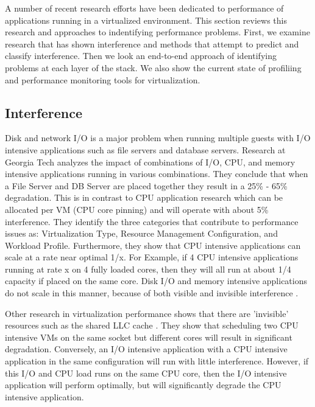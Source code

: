 A number of recent research efforts have been dedicated to performance of applications running in a virtualized environment.  This section reviews this research and approaches to indentifying performance problems.  First, we examine research that has shown interference and methods that attempt to predict and classify interference.   Then we look an end-to-end approach of identifying problems at each layer of the stack.  We also show the current state of profiliing and performance monitoring tools for virtualization.

\subsection{Interference}
Disk and network I/O is a major problem when running multiple guests with I/O intensive applications such as file servers and database servers.  Research at Georgia Tech \cite{paul} analyzes the impact of combinations of I/O, CPU, and memory intensive applications running in various combinations.  They conclude that when a File Server and DB Server are placed together they result in a 25\% - 65\% degradation.  This is in contrast to CPU application research \cite{huber1, huber2} which can be allocated per VM (CPU core pinning) and will operate with about 5\% interference.  They identify the three categories that contribute to performance issues as:  Virtualization Type, Resource Management Configuration, and Workload Profile.  Furthermore, they show that CPU intensive applications can scale at a rate near optimal 1/x.   For Example, if 4 CPU intensive applications running at rate x on 4 fully loaded cores, then they will all run at about 1/4 capacity if placed on the same core.   Disk I/O and memory intensive applications do not scale in this manner, because of both visible and invisible interference \cite{tickoo}.

Other research in virtualization performance shows that there are 'invisible' resources such as the shared LLC cache \cite{tickoo}.  They show that scheduling two CPU intensive VMs on the same socket but different cores will result in significant degradation.  Conversely, an I/O intensive application with a CPU intensive application in the same configuration will run with little interference.  However, if this I/O and CPU load runs on the same CPU core, then the I/O intensive application will perform optimally, but will significantly degrade the CPU intensive application.

